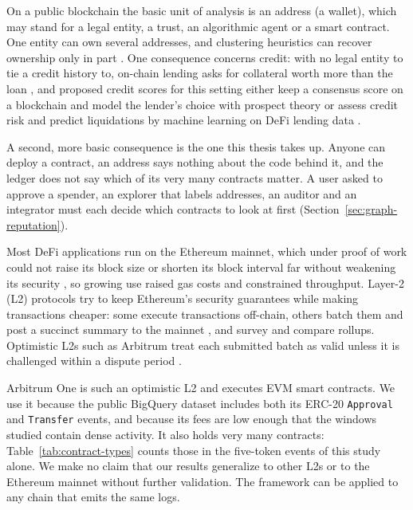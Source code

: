 
On a public blockchain the basic unit of analysis is an address (a wallet), which may stand for a legal entity, a trust, an algorithmic agent or a smart contract. One entity can own several addresses, and clustering heuristics can recover ownership only in part \parencite{victor2020clustering}. One consequence concerns credit: with no legal entity to tie a credit history to, on-chain lending asks for collateral worth more than the loan \parencite{bartoletti2021lending}, and proposed credit scores for this setting either keep a consensus score on a blockchain and model the lender's choice with prospect theory \parencite{hassija2020lending} or assess credit risk and predict liquidations by machine learning on DeFi lending data \parencite{palaiokrassas2024credit}.

A second, more basic consequence is the one this thesis takes up. Anyone can deploy a contract, an address says nothing about the code behind it, and the ledger does not say which of its very many contracts matter. A user asked to approve a spender, an explorer that labels addresses, an auditor and an integrator must each decide which contracts to look at first (Section~\ref{sec:graph-reputation}).


Most DeFi applications run on the Ethereum mainnet, which under proof of work could not raise its block size or shorten its block interval far without weakening its security \parencite{gervais2016pow}, so growing use raised gas costs and constrained throughput. Layer-2 (L2) protocols try to keep Ethereum's security guarantees while making transactions cheaper: some execute transactions off-chain, others batch them and post a succinct summary to the mainnet \parencite{gudgeon2020layertwo}, and \textcite{thibault2022rollups} survey and compare rollups. Optimistic L2s such as Arbitrum treat each submitted batch as valid unless it is challenged within a dispute period \parencite{kalodner2018arbitrum}.

Arbitrum One is such an optimistic L2 and executes EVM smart contracts. We use it because the public BigQuery dataset includes both its ERC-20 \texttt{Approval} and \texttt{Transfer} events, and because its fees are low enough that the windows studied contain dense activity. It also holds very many contracts: Table~\ref{tab:contract-types} counts those in the five-token events of this study alone. We make no claim that our results generalize to other L2s or to the Ethereum mainnet without further validation. The framework can be applied to any chain that emits the same logs.

